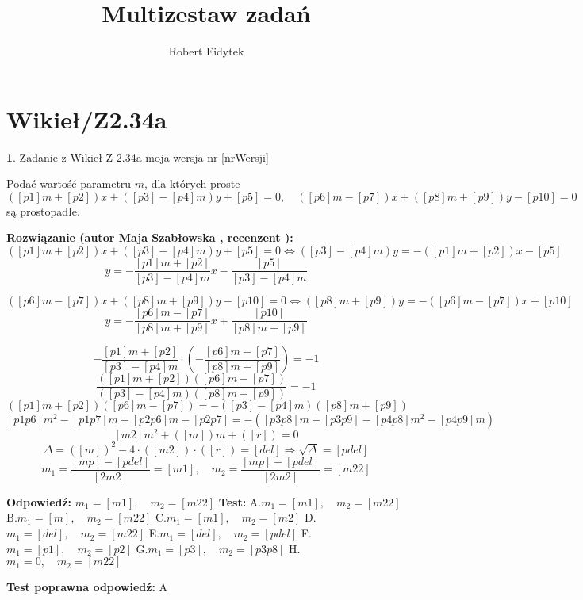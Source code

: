 \documentclass[12pt, a4paper]{article}
\title{Multizestaw zadań}
\author{Robert Fidytek}
\date{}
\theoremstyle{definition} %
\newtheorem{zad}{}
\newcommand{\kategoria}[1]{\section{#1}} %
\newcommand{\zadStart}[1]{\begin{zad}#1\newline} %
\newcommand{\zadStop}{\end{zad}}   %
\newcommand{\rozwStart}[2]{\noindent \textbf{Rozwiązanie (autor #1 , recenzent #2): }\newline} %
\newcommand{\rozwStop}{\newline}                                            %
\newcommand{\odpStart}{\noindent \textbf{Odpowiedź:}\newline}    %
\newcommand{\odpStop}{\newline}                                             %
\newcommand{\testStart}{\noindent \textbf{Test:}\newline} %
\newcommand{\testStop}{\newline} %
\newcommand{\kluczStart}{\noindent \textbf{Test poprawna odpowiedź:}\newline} %
\newcommand{\kluczStop}{\newline} %
\begin{document}
\maketitle


\kategoria{Wikieł/Z2.34a}
\zadStart{Zadanie z Wikieł Z 2.34a  moja wersja nr [nrWersji]}

Podać wartość parametru $m$, dla których proste 
$$([p1]m+[p2])x+([p3]-[p4]m)y+[p5]=0, \quad ([p6]m-[p7])x+([p8]m+[p9])y-[p10]=0 $$są prostopadłe.
\zadStop

\rozwStart{Maja Szabłowska}{}
$$([p1]m+[p2])x+([p3]-[p4]m)y+[p5]=0 \iff ([p3]-[p4]m)y=-([p1]m+[p2])x-[p5]$$
$$y=-\frac{[p1]m+[p2]}{[p3]-[p4]m}x-\frac{[p5]}{[p3]-[p4]m}$$

$$([p6]m-[p7])x+([p8]m+[p9])y-[p10]=0 \iff ([p8]m+[p9])y=-([p6]m-[p7])x+[p10]$$
$$y=-\frac{[p6]m-[p7]}{[p8]m+[p9]}x+\frac{[p10]}{[p8]m+[p9]}$$

$$-\frac{[p1]m+[p2]}{[p3]-[p4]m}\cdot\left(-\frac{[p6]m-[p7]}{[p8]m+[p9]}\right)=-1$$ 
$$\frac{([p1]m+[p2])([p6]m-[p7])}{([p3]-[p4]m)([p8]m+[p9])}=-1$$
$$([p1]m+[p2])([p6]m-[p7])=-([p3]-[p4]m)([p8]m+[p9])$$
$$[p1p6]m^{2}-[p1p7]m+[p2p6]m-[p2p7]=-([p3p8]m+[p3p9]-[p4p8]m^{2}-[p4p9]m)$$
$$[m2]m^{2}+([m])m+([r])=0$$
$$\Delta=([m])^{2}-4\cdot([m2])\cdot([r])=[del] \Rightarrow \sqrt{\Delta}=[pdel]$$
$$m_{1}=\frac{[mp]-[pdel]}{[2m2]}=[m1], \quad m_{2}=\frac{[mp]+[pdel]}{[2m2]}=[m22]$$
\rozwStop


\odpStart
$m_{1}=[m1], \quad m_{2}=[m22]$
\odpStop
\testStart
A.$m_{1}=[m1], \quad m_{2}=[m22]$
B.$m_{1}=[m], \quad m_{2}=[m22]$
C.$m_{1}=[m1], \quad m_{2}=[m2]$
D.$m_{1}=[del], \quad m_{2}=[m22]$
E.$m_{1}=[del], \quad m_{2}=[pdel]$
F.$m_{1}=[p1], \quad m_{2}=[p2]$
G.$m_{1}=[p3], \quad m_{2}=[p3p8]$
H.$m_{1}=0, \quad m_{2}=[m22]$

\testStop
\kluczStart
A
\kluczStop
\end{document}
